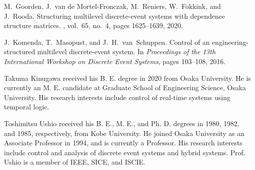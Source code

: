 \documentclass[journal,twoside,web]{IEEEtran}
\begin{document}
\begin{thebibliography}{99}
%
M.~{Goorden}, J.~van de Mortel-Fronczak, M.~{Reniers}, W.~{Fokkink}, and J.~{Rooda}.
\newblock Structuring multilevel discrete-event systems with dependence structure matrices.
, vol.~65, no.~4, pages 1625--1639, 2020.

%
J.~{Komenda}, T.~{Masopust}, and J.~H.~van~Schuppen.
\newblock Control of an engineering-structured multilevel discrete-event system.
\newblock In {\em Proceedings of the 13th International Workshop on Discrete Event Systems}, pages 103--108, 2016.

\end{thebibliography}

\begin{IEEEbiographynophoto}{Takuma Kinugawa}
received his B. E. degree in 2020 from Osaka University. He is currently an M. E. candidate at Graduate School of Engineering Science, Osaka University. His research interests include control of real-time systems using temporal logic.
\end{IEEEbiographynophoto}
%
\begin{IEEEbiographynophoto}{Toshimitsu Ushio}
received his B. E., M. E., and Ph. D. degrees in 1980, 1982, and 1985, respectively,
from Kobe University.  He joined Osaka University as an Associate Professor in 1994, and is currently a Professor. His research interests include control and analysis of discrete event systems and hybrid systems.  Prof. Ushio is a member of IEEE, SICE, and ISCIE.
\end{IEEEbiographynophoto}
%
\end{document}
